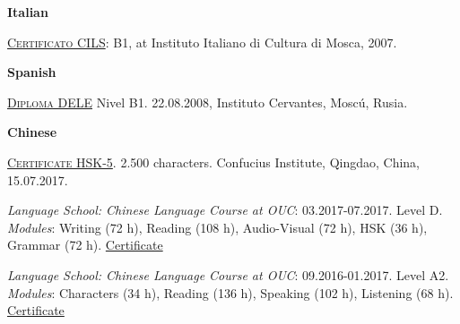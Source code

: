 \documentclass[10pt]{article}
\newenvironment{innerlist}[1][\enskip\textbullet]%
        {\begin{compactitem}[#1]}{\end{compactitem}}
\begin{document}
\textbf{Italian}
	\begin{innerlist}	
		\item \href{https://drive.google.com/file/d/1kv1r05YPYx12nL93V1nSJ8-s9UDlAyWF/view?usp=sharing}{\textsc{Certificato CILS}}: B1, at Instituto Italiano di Cultura di Mosca, 2007.
	\end{innerlist}

\textbf{Spanish}
	\begin{innerlist}	
		\item \href{https://drive.google.com/file/d/14j7dgoqT4q8sH-WCjJ32yxLxirUzCEBb/view?usp=sharing}{\textsc{Diploma DELE}} Nivel B1. 22.08.2008, Instituto Cervantes, Mosc\' u, Rusia.
	\end{innerlist}
	
\textbf{Chinese}
\begin{innerlist}	
	\item \href{https://drive.google.com/file/d/1lC_0fSOB2GBgjHjqpI1Y1MVf_rfME-Ti/view?usp=sharing}{\textsc{Certificate HSK-5}}. 2.500 characters. Confucius Institute, Qingdao, China, 15.07.2017. 
 	\item \textit{Language School: Chinese Language Course at OUC}: 03.2017-07.2017. Level D. \textit{Modules}: Writing (72 h), Reading (108 h), Audio-Visual (72 h), HSK (36 h), Grammar (72 h). \href{https://drive.google.com/file/d/1XjumFazgragLWP8WBfnqvn4K-t8KR5ak/view?usp=sharing}{Certificate}
 	\item \textit{Language School: Chinese Language Course at OUC}: 09.2016-01.2017. Level A2. \textit{Modules}: Characters (34 h), Reading (136 h), Speaking (102 h),  Listening (68 h). \href{https://drive.google.com/file/d/14VoH4jozIk7tanwjd70ImzK_NnB8l4yU/view?usp=sharing}{Certificate}
	\end{innerlist}
	
\end{document}
